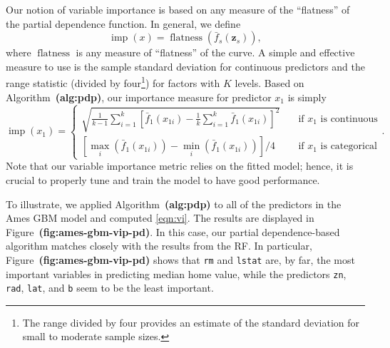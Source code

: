 \documentclass[12pt]{article}
\def\code#1{\texttt{#1}}
\def\ref#1{\textbf{(#1)}}
\DeclareMathOperator{\flatness}{flatness}
\DeclareMathOperator{\imp}{imp}
\begin{document}
Our notion of variable importance is based on any measure of the ``flatness'' of the partial dependence function. In general, we define
\begin{equation*}
  \imp\left(x\right) = \flatness\left(\bar{f}_s\left(\boldsymbol{z}_s\right)\right),
\end{equation*}
where $\flatness$ is any measure of ``flatness'' of the curve. A simple and effective measure to use is the sample standard deviation for continuous predictors and the range statistic (divided by four\footnote{The range divided by four provides an estimate of the standard deviation for small to moderate sample sizes.}) for factors with $K$ levels. Based on Algorithm~\ref{alg:pdp}, our importance measure for predictor $x_1$ is simply
\begin{equation}
\label{eqn:vi}
  \imp\left(x_1\right) = 
  \begin{cases}
    \sqrt{\frac{1}{k - 1}\sum_{i = 1}^k\left[\bar{f}_1\left(x_{1i}\right) - \frac{1}{k}\sum_{i = 1}^k\bar{f}_1\left(x_{1i}\right)\right] ^ 2} & \quad \text{if } x_1 \text{ is continuous}\\
    \left[\max_i\left(\bar{f}_1\left(x_{1i}\right)\right) - \min_i\left(\bar{f}_1\left(x_{1i}\right)\right)\right] / 4 & \quad \text{if } x_1 \text{ is categorical}
  \end{cases}.
\end{equation}
Note that our variable importance metric relies on the fitted model; hence, it is crucial to properly tune and train the model to have good performance.

To illustrate, we applied Algorithm~\ref{alg:pdp} to all of the predictors in the Ames GBM model and computed \eqref{eqn:vi}. The results are displayed in Figure~\ref{fig:ames-gbm-vip-pd}. In this case, our partial dependence-based algorithm matches closely with the results from the RF. In particular, Figure~\ref{fig:ames-gbm-vip-pd} shows that \code{rm} and \code{lstat} are, by far, the most important variables in predicting median home value, while the predictors \code{zn}, \code{rad}, \code{lat}, and \code{b} seem to be the least important.
\end{document}

